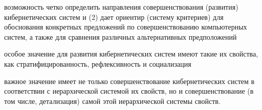 \begin{SCn}
\begin{scnsubstruct}
{\begin{scnitemize}
				возможность четко определить направления совершенствования (развития)
				кибернетических систем и (2) дает ориентир (систему критериев) для обоснования
				конкретных предложений по совершенствованию компьютерных систем, а также для
				сравнения различных альтернативных предположений
				\item особое значение для развития кибернетических систем имеют такие
				их свойства, как стратифицированность, рефлексивность и социализация
				\item важное значение имеет не только совершенствование кибернетических
				систем в соответствии с иерархической системой их свойств, но и
				совершенствование (в том числе, детализация) самой этой иерархической системы
				свойств.
			\end{scnitemize}}



\end{scnsubstruct}
\end{SCn}
